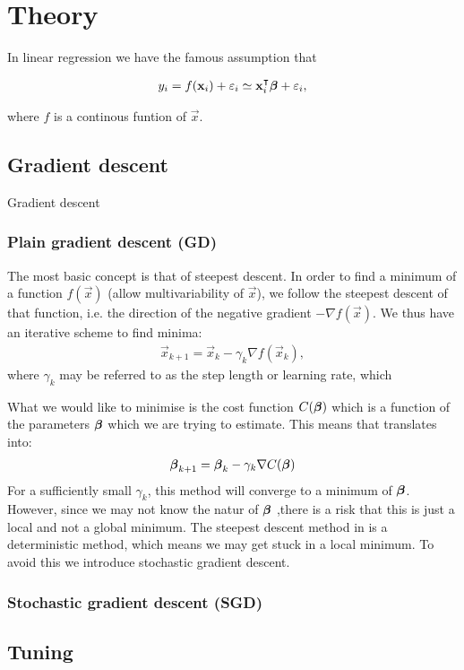 \section{Theory}\label{sec:theory}

In linear regression we have the famous assumption that 

\begin{align}
    y_i = f(\mathbf{x}_i) + \varepsilon_i \simeq \mathbf{x}_i^\intercal \boldsymbol{\beta} + \varepsilon_i,
\end{align}

where $f$ is a continous funtion of $\vec{x}$.  


\subsection{Gradient descent}\label{sec:gradient_descent}
Gradient descent \citep{mhjensen} 

\subsubsection{Plain gradient descent (GD)}\label{sec:plain_gradient_descent}
The most basic concept is that of steepest descent. In order to find a minimum of a function $f(\vec{x})$ (allow multivariability of $\vec{x}$), we follow the steepest descent of that function, i.e. the direction of the negative gradient $-\nabla f(\vec{x})$. We thus have an iterative scheme to find minima:
\begin{align}\label{eq:steepest_descent}
    \vec{x}_{k+1} = \vec{x}_k - \gamma_k\nabla f(\vec{x}_k),
\end{align}
where $\gamma_k$ may be referred to as the step length or learning rate, which \fillertext

What we would like to minimise is the cost function $C(\boldsymbol{\beta})$ which is a function of the parameters $\boldsymbol{\beta}$ which we are trying to estimate. This means that  translates into:
\begin{align}\label{eq:steepest_descent_cost_function}
    \boldsymbol{\beta}_{k+1} = \boldsymbol{\beta}_k - \gamma_k\nabla C(\boldsymbol{\beta})
\end{align}
For a sufficiently small $\gamma_k$, this method will converge to a minimum of $\boldsymbol{\beta}$. However, since we may not know the natur of $\boldsymbol{\beta}$ ,there is a risk that this is just a local and not a global minimum. The steepest descent method in  is a deterministic method, which means we may get stuck in a local minimum. To avoid this we introduce stochastic gradient descent. 

\subsubsection{Stochastic gradient descent (SGD)}\label{sec:stochastic_gradient_descent}


\subsection{Tuning}


